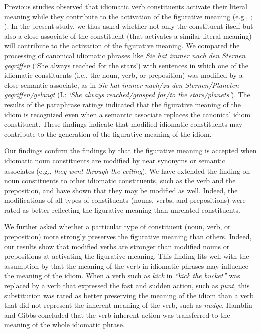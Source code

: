 \documentclass[output=paper]{langsci/langscibook}
\begin{document}
Previous studies observed that idiomatic verb constituents activate their literal meaning while they contribute to the activation of the figurative meaning (e.g., \citealt{rabanus:2008}; \citealt{smolka:2007}). In the present study, we thus asked whether not only the constituent itself but also a close associate of the constituent (that activates a similar literal meaning) will contribute to the activation of the figurative meaning. We compared the processing of canonical idiomatic phrases like \textit{Sie hat immer nach den Sternen gegriffen} (‘She always reached for the stars’) with sentences in which one of the idiomatic constituents (i.e., the noun, verb, or preposition) was modified by a close semantic associate, as in \textit{Sie hat immer nach/zu den Sternen/Planeten gegriffen/gelangt} (L: \textit{‘She always reached/grasped for/to the stars/planets’}). The results of the paraphrase ratings indicated that the figurative meaning of the idiom is recognized even when a semantic associate replaces the canonical idiom constituent. These findings indicate that modified idiomatic constituents may contribute to the generation of the figurative meaning of the idiom. 

Our findings confirm the findings by \citealt{geeraert:2017} that the figurative meaning is accepted when idiomatic noun constituents are modified by near synonyms or semantic associates (e.g., \textit{they went through the ceiling}).  We have extended the finding on noun constituents to other idiomatic constituents, such as the verb and the preposition, and have shown that they may be modified as well. Indeed, the modifications of all types of constituents (nouns, verbs, and prepositions) were rated as better reflecting the figurative meaning than unrelated constituents. 

We further asked whether a particular type of constituent (noun, verb, or preposition) more strongly preserves the figurative meaning than others.  Indeed, our results show that modified verbs are stronger than modified nouns or prepositions at activating the figurative meaning. This finding fits well with the assumption by \citealt{hamblin:1999} that the meaning of the verb in idiomatic phrases may influence the meaning of the idiom. When a verb such as \textit{kick} in \textit{``kick the bucket''} was replaced by a verb that expressed the fast and sudden action, such as \textit{punt}, this substitution was rated as better preserving the meaning of the idiom than a verb that did not represent the inherent meaning of the verb, such as \textit{nudge}. Hamblin and Gibbs concluded that the verb-inherent action was transferred to the meaning of the whole idiomatic phrase.
\end{document}
